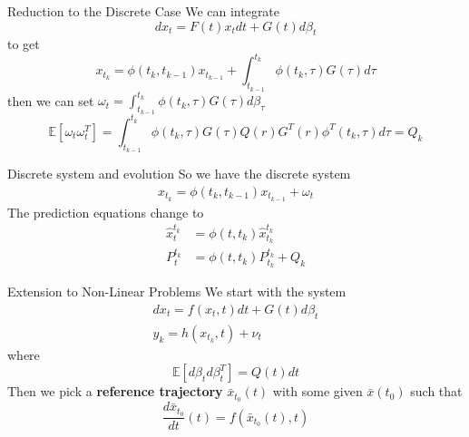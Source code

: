 \documentclass{beamer}
\begin{document}
\begin{frame}{Reduction to the Discrete Case}
  We can integrate
  \begin{equation}
    dx_t = F(t) x_t dt + G(t) d\beta_t 
  \end{equation}
  to get
  \begin{equation}
    x_{t_k} = \phi(t_k,t_{k-1})x_{t_{k-1}} + \int_{t_{k-1}}^{t_k} \phi(t_k,\tau) G(\tau) d\tau
  \end{equation}
  then we can set $ \omega_t = \int_{t_{k-1}}^{t_k} \phi(t_k,\tau) G(\tau) d\beta_\tau $ 
  \begin{equation}
    \mathbb{E}[\omega_t\omega_t^T] = \int_{t_{k-1}}^{t_k} \phi(t_k,\tau) G(\tau) Q(r) G^T(r) \phi^T(t_k,\tau)  d\tau = Q_k
  \end{equation}
\end{frame}

\begin{frame}{Discrete system and evolution}
  So we have the discrete system
  \begin{align}
    x_{t_k} = \phi(t_k,t_{k-1})x_{t_{k-1}} + \omega_t
  \end{align}
  The prediction equations change to
  \begin{align}
    \hat{x}^{t_k}_t &= \phi(t,t_k)\hat{x}^{t_k}_{t_k} \\
    P^{t_k}_t &= \phi(t,t_k)P^{t_k}_{t_k} +  Q_k
  \end{align}

\end{frame}

 
\begin{frame}{Extension to Non-Linear Problems}
  We start with the system
  \begin{align}
    dx_t = f(x_t,t)dt + G(t)d\beta_t \\
    y_k = h(x_{t_k}, t) + \nu_t
  \end{align}
  where
  \begin{equation}
    \mathbb{E}[d\beta_td\beta^T_t] = Q(t) dt
  \end{equation}
  Then we pick a \textbf{reference trajectory} $\bar{x}_{t_0}(t)$ with some given
  $\bar{x}(t_0)$ such that
  \begin{equation}
    \frac{d\bar{x}_{t_0}}{dt}(t) = f(\bar{x}_{t_0}(t),t)
  \end{equation}
\end{frame}
\end{document}
